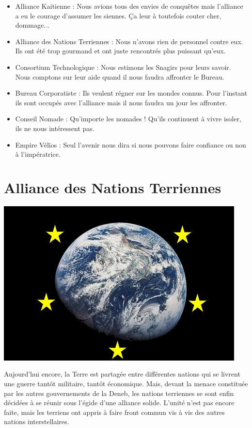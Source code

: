 \begin{multicols}{2}
\begin{itemize}
\item Alliance Kaitienne : Nous avions tous des envies de conquêtes mais l'alliance a eu le courage d'assumer les siennes. Ça leur à toutefois couter cher, dommage...
\item Alliance des Nations Terriennes : Nous n'avons rien de personnel contre eux. Ils ont été trop gourmand et ont juste rencontrés plus puissant qu'eux.
\item Consortium Technologique : Nous estimons les Snagirs pour leurs savoir. Nous comptons sur leur aide quand il nous faudra affronter le Bureau.
\item Bureau Corporatiste : Ils veulent régner sur les mondes connus. Pour l'instant ils sont occupés avec l'alliance mais il nous faudra un jour les affronter.
\item Conseil Nomade : Qu'importe les nomades ! Qu'ils continuent à vivre isoler, ils ne nous intéressent pas.
\item Empire Vélïos : Seul l'avenir nous dira si nous pouvons faire confiance ou non à l'impératrice.
\end{itemize}

\section{Alliance des Nations Terriennes}

\begin{center}
\includegraphics[scale=0.3]{Img/logo_at}
\end{center}

Aujourd'hui encore, la Terre est partagée entre différentes nations qui se livrent une guerre tantôt militaire, tantôt économique. Mais, devant la menace constituée par les autres gouvernements de la Deneb, les nations terriennes se sont enfin décidées à se réunir sous l'égide d'une alliance solide. L'unité n'est pas encore faite, mais les terriens ont appris à faire front commun vis à vis des autres nations interstellaires.


\end{multicols}
